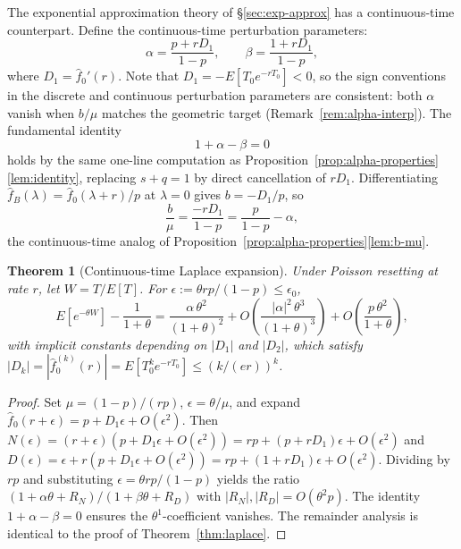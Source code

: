 \documentclass[11pt]{article}
\theoremstyle{plain}
\newtheorem{theorem}{Theorem}[section]
\theoremstyle{definition}
\theoremstyle{remark}
\begin{document}
The exponential approximation theory of \S\ref{sec:exp-approx} has a continuous-time counterpart.  Define the continuous-time perturbation parameters:
\begin{equation}\label{eq:ct-alpha}
  \alpha = \frac{p + rD_1}{1-p}, \qquad \beta = \frac{1 + rD_1}{1-p},
\end{equation}
where $D_1 = \hat{f}_0'(r)$.  Note that $D_1 = -E[T_0 e^{-rT_0}] < 0$, so the sign conventions in the discrete and continuous perturbation parameters are consistent: both $\alpha$ vanish when $b/\mu$ matches the geometric target (Remark~\ref{rem:alpha-interp}). 
The fundamental identity 
\begin{equation}\label{lem:ct-identity}
    1 + \alpha - \beta = 0 
\end{equation} holds by the same one-line computation as Proposition~\ref{prop:alpha-properties}\eqref{lem:identity}, replacing $s+q=1$ by direct cancellation of $rD_1$. Differentiating $\hat{f}_B(\lambda) = \hat{f}_0(\lambda+r)/p$ at $\lambda = 0$ gives $b = -D_1/p$, so
\begin{equation}\label{lem:ct-b-mu}
  \frac{b}{\mu} = \frac{-rD_1}{1-p} = \frac{p}{1-p} - \alpha,
\end{equation}
the continuous-time analog of Proposition~\ref{prop:alpha-properties}\eqref{lem:b-mu}.




\begin{theorem}[Continuous-time Laplace expansion]\label{thm:ct-laplace}
Under Poisson resetting at rate $r$, let $W = T/E[T]$.  For $\epsilon := \theta rp/(1-p) \leq \epsilon_0$,
\begin{equation}\label{eq:ct-laplace}
  E[e^{-\theta W}] - \frac{1}{1+\theta}
  = \frac{\alpha\,\theta^2}{(1+\theta)^2}
  + O\!\left(\frac{|\alpha|^2\,\theta^3}{(1+\theta)^3}\right)
  + O\!\left(\frac{p\,\theta^2}{1+\theta}\right),
\end{equation}
with implicit constants depending on $|D_1|$ and $|D_2|$, which satisfy $|D_k| = |\hat{f}_0^{(k)}(r)| = E[T_0^k e^{-rT_0}] \leq (k/(er))^k$.
\end{theorem}

\begin{proof}
Set $\mu = (1-p)/(rp)$, $\epsilon = \theta/\mu$, and expand $\hat{f}_0(r+\epsilon) = p + D_1\epsilon + O(\epsilon^2)$.  Then $N(\epsilon) = (r+\epsilon)(p + D_1\epsilon + O(\epsilon^2)) = rp + (p+rD_1)\epsilon + O(\epsilon^2)$ and $D(\epsilon) = \epsilon + r(p + D_1\epsilon + O(\epsilon^2)) = rp + (1+rD_1)\epsilon + O(\epsilon^2)$.  Dividing by $rp$ and substituting $\epsilon = \theta rp/(1-p)$ yields the ratio $(1+\alpha\theta+R_N)/(1+\beta\theta+R_D)$ with $|R_N|, |R_D| = O(\theta^2 p)$.  The identity $1+\alpha-\beta = 0$ ensures the $\theta^1$-coefficient vanishes.  The remainder analysis is identical to the proof of Theorem~\ref{thm:laplace}.
\end{proof}
\end{document}
